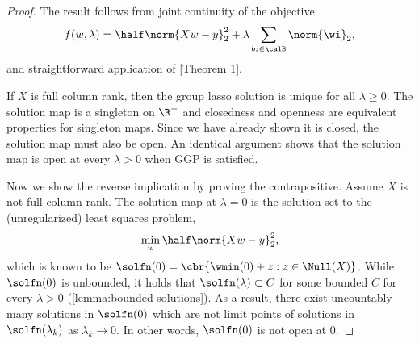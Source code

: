 \mapContinuity*
\begin{proof}
	The result follows from joint continuity of the objective
	\[
		f(w, \lambda) = \half \norm{X w - y}_2^2 + \lambda \sum_{b_i \in \calB} \norm{\wi}_2,
	\]
	and straightforward application of \citet{robinson1974sufficient}[Theorem 1].

	If \( X \) is full column rank, then the group lasso solution is
	unique for all \( \lambda \geq 0 \).
	The solution map is a singleton on \( \R^+ \) and closedness
	and openness are equivalent properties for singleton maps.
	Since we have already shown it is closed, the solution map
	must also be open.
	An identical argument shows that the solution map is open
	at every \( \lambda > 0 \) when GGP is satisfied.

	Now we show the reverse implication by proving the contrapositive.
	Assume \( X \) is not full column-rank.
	The solution map at \( \lambda = 0 \) is the solution set to the
	(unregularized) least squares problem,
	\[
		\min_w \half \norm{X w - y}_2^2,
	\]
	which is known to be \( \solfn(0) = \cbr{\wmin(0) + z : z \in \Null(X)} \).
	While \( \solfn(0) \) is unbounded, it holds that
	\( \solfn(\lambda) \subset C \) for some bounded \( C \) for
	every \( \lambda > 0 \) (\cref{lemma:bounded-solutions}).
	As a result, there exist uncountably many solutions in \( \solfn(0) \)
	which are not limit points of solutions in \( \solfn(\lambda_k) \)
	as \( \lambda_k \rightarrow 0 \).
	In other words, \( \solfn(0) \) is not open at \( 0 \).




\end{proof}
